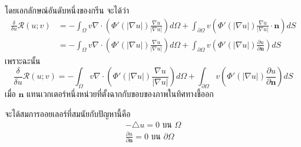 \begin{Example}
    โดยเอกลักษณ์อันดับหนึ่งของกรีน จะได้ว่า
    \begin{align*}
    \frac{\delta}{\delta u}\mathcal{R}(u;v) &= - \int_{\Omega}^{} v \nabla \cdot \left(\Phi'(|\nabla u|) \frac{\nabla u}{|\nabla u|} \right)d\Omega + \int_{\partial \Omega}^{} v \left(\Phi'(|\nabla u|) \frac{\nabla u}{|\nabla u|} \cdot \boldsymbol{n}\right) dS \\
    &= -\int_{\Omega}^{} v \nabla \cdot \left(\Phi'(|\nabla u|) \frac{\nabla u}{|\nabla u|} \right)d\Omega + \int_{\partial \Omega}^{} v \left(\Phi'(|\nabla u|)  \frac{\partial u}{\partial \boldsymbol{n}}\right) dS
    \end{align*}
    เพราะฉะนั้น  
    \[
    \frac{\delta}{\delta u}\mathcal{R}(u;v) = -\int_{\Omega}^{} v \nabla \cdot \left(\Phi'(|\nabla u|) \frac{\nabla u}{|\nabla u|} \right)d\Omega + \int_{\partial \Omega}^{} v \left(\Phi'(|\nabla u|)  \frac{\partial u}{\partial \boldsymbol{n}}\right) dS
    \]
    เมื่อ $  \boldsymbol{n} $ แทนเวกเตอร์หนึ่งหน่วยที่ตั้งฉากกับขอบของภาพในทิศทางชี้ออก

    จะได้สมการออยเลอร์ที่สมนัยกับปัญหานี้คือ
    \begin{align*}
        - \triangle u = 0 \text{ บน } \Omega \\
        \frac{ \partial  u }{ \partial \boldsymbol{n}} = 0 \text{ บน } \partial \Omega
    \end{align*}
\end{Example}